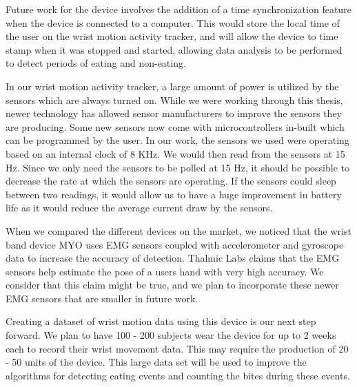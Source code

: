 Future work for the device
involves the addition of a time synchronization feature when the device is connected to a computer.
This would store the local time of the user on the wrist motion activity tracker,
and will allow the device to time stamp when it was stopped and started,
allowing data analysis to be performed to detect periods of eating and non-eating.

In our wrist motion activity tracker,
a large amount of power is utilized by the sensors which are always turned on.
While we were working through this thesis,
newer technology has allowed sensor manufacturers to improve the sensors they are producing.
Some new sensors now come with microcontrollers in-built which can be programmed by the user.
In our work,
the sensors we used
were operating based on an internal clock of 8 KHz.
We would then read from the sensors at 15 Hz.
Since we only need the sensors to be polled at 15 Hz,
it should be possible to decrease the rate at which the sensors are operating.
If the sensors could sleep between two readings,
it would allow us to have a huge improvement in battery life as it would reduce the average current draw by the sensors.

When we compared the different devices on the market,
we noticed that the wrist band device MYO uses EMG sensors coupled with accelerometer and gyroscope data to increase the accuracy of detection.
Thalmic Labs \cite{Web:GetMyo} claims that the EMG sensors help estimate the pose of a users hand with very high accuracy.
We consider that this claim might be true,
and we plan to incorporate these newer EMG sensors that are smaller in future work.

Creating a dataset of wrist motion data using this device is our next step forward.
We plan to have 100 - 200 subjects wear the device for up to
2 weeks each to record their wrist movement data.
This may require the production of 20 - 50 units of the device.
This large data set will be used to improve the algorithms for detecting eating events and counting the bites during these events.